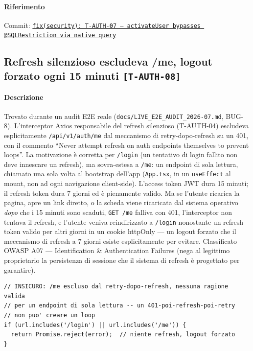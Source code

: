 ﻿\documentclass[a4paper,12pt]{report}
\newcommand{\commitref}[2]{\texttt{\small \href{https://github.com/diegoandruccioli/hotel-pms/commit/#1}{#2}}}
\newcommand{\threat}[1]{\texttt{\small\textcolor{vulnred}{[#1]}}}
\begin{document}
\paragraph{Riferimento} Commit: \commitref{[pending]}{fix(security): T-AUTH-07 --- activateUser bypasses @SQLRestriction via native query}

\subsection{Refresh silenzioso escludeva /me, logout forzato ogni 15 minuti \threat{T-AUTH-08}}

\paragraph{Descrizione}
Trovato durante un audit E2E reale (\texttt{docs/LIVE\_E2E\_AUDIT\_2026-07.md},
BUG-8). L'interceptor Axios responsabile del refresh silenzioso (T-AUTH-04)
escludeva esplicitamente \texttt{/api/v1/auth/me} dal meccanismo di
retry-dopo-refresh su un 401, con il commento ``Never attempt refresh on auth
endpoints themselves to prevent loops''. La motivazione è corretta per
\texttt{/login} (un tentativo di login fallito non deve innescare un
refresh), ma sovra-estesa a \texttt{/me}: un endpoint di sola lettura,
chiamato una sola volta al bootstrap dell'app (\texttt{App.tsx}, in un
\texttt{useEffect} al mount, non ad ogni navigazione client-side). L'access
token JWT dura 15 minuti; il refresh token dura 7 giorni ed è pienamente
valido. Ma se l'utente ricarica la pagina, apre un link diretto, o la scheda
viene ricaricata dal sistema operativo \emph{dopo} che i 15 minuti sono
scaduti, \texttt{GET /me} falliva con 401, l'interceptor non tentava il
refresh, e l'utente veniva reindirizzato a \texttt{/login} nonostante un
refresh token valido per altri giorni in un cookie httpOnly --- un logout
forzato che il meccanismo di refresh a 7 giorni esiste esplicitamente per
evitare. Classificato OWASP A07 --- Identification \& Authentication
Failures (nega al legittimo proprietario la persistenza di sessione che il
sistema di refresh è progettato per garantire).

\begin{insecurebox}[title={Codice Vulnerabile --- api.ts (baseline)}]
\begin{lstlisting}[style=java]
// INSICURO: /me escluso dal retry-dopo-refresh, nessuna ragione valida
// per un endpoint di sola lettura -- un 401-poi-refresh-poi-retry
// non puo' creare un loop
if (url.includes('/login') || url.includes('/me')) {
  return Promise.reject(error);  // niente refresh, logout forzato
}
\end{lstlisting}
\end{insecurebox}
\end{document}
